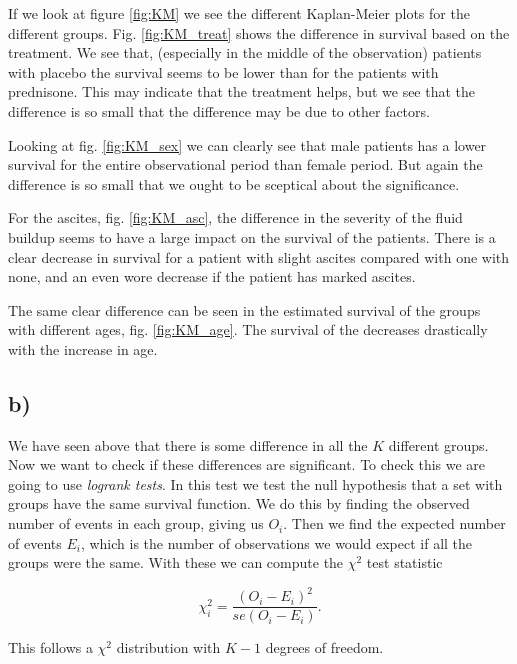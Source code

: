 \documentclass[a4paper,norsk, 10pt]{article}
\begin{document}
If we look at figure \ref{fig:KM} we see the different Kaplan-Meier plots for the different groups. Fig. \ref{fig:KM_treat} shows the difference in survival based on the treatment. We see that, (especially in the middle of the observation) patients with placebo the survival seems to be lower than for the patients with prednisone. This may indicate that the treatment helps, but we see that the difference is so small that the difference may be due to other factors.

Looking at fig. \ref{fig:KM_sex} we can clearly see that male patients has a lower survival for the entire observational period than female period. But again the difference is so small that we ought to be sceptical about the significance.

For the ascites, fig. \ref{fig:KM_asc}, the difference in the severity of the fluid buildup seems to have a large impact on the survival of the patients. There is a clear decrease in survival for a patient with slight ascites compared with one with none, and an even wore decrease if the patient has marked ascites.

The same clear difference can be seen in the estimated survival of the groups with different ages, fig. \ref{fig:KM_age}. The survival of the decreases drastically with the increase in age.


\subsection{b)}

We have seen above that there is some difference in all the $K$ different groups. Now we want to check if these differences are significant. To check this we are going to use \textit{logrank tests}. In this test we test the null hypothesis that a set with groups have the same survival function. We do this by finding the observed number of events in each group, giving us $O_i$. Then we find the expected number of events $E_i$, which is the number of observations we would expect if all the groups were the same. With these we can compute the $\chi^2$ test statistic

\begin{equation}
\chi^2_i = \frac{(O_i - E_i)^2}{se(O_i-E_i)}.
\end{equation}

This follows a $\chi^2$ distribution with $K-1$ degrees of freedom.
\end{document}
